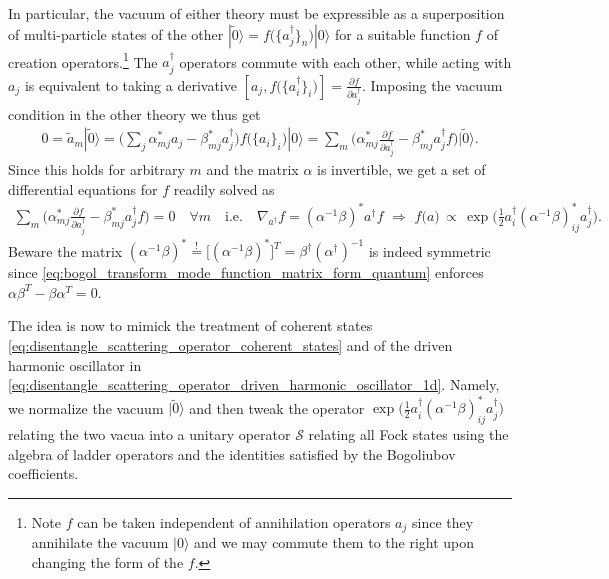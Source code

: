 \documentclass[../QFT_main.tex]{subfiles}
\begin{document}
\begin{mytheorem}
In particular, the vacuum of either theory must be expressible as a superposition of multi-particle states of the other $|\tilde{0}\rangle =f\big(\{{a}^\dagger_j\}_n\big)|0\rangle$ for a suitable function $f$ of creation operators.\footnote{Note $f$ can be taken independent of annihilation operators ${a}_j$ since they annihilate the vacuum $|0\rangle$ and we may commute them to the right upon changing the form of the $f$.}
The ${a}_j^\dagger$ operators commute with each other, while acting with $a_j$ is equivalent to taking a derivative $[a_j,f\big(\{a^\dagger_i\}_i\big)] = \tfrac{\partial f}{\partial a_j^\dagger}$.
Imposing the vacuum condition in the other theory we thus get
{\small
\begin{align}
     0=\tilde{a}_m|\tilde{0}\rangle
     = \Big(\sum_j \alpha_{mj}^* a_j - \beta_{mj}^* a_j^\dagger\Big) f\big(\{a_i\}_i\big)|0\rangle = \sum_m \Big(\alpha_{mj}^* \frac{\partial f}{\partial a_j^\dagger} - \beta_{mj}^* a_j^\dagger f\Big)|\tilde{0}\rangle.
\end{align}}
Since this holds for arbitrary $m$ and the matrix $\alpha$ is invertible, we get a set of differential equations for $f$ readily solved as
{\small\begin{align}
    \sum_m \Big(\alpha_{mj}^* \frac{\partial f}{\partial a_j^\dagger} - \beta_{mj}^* a_j^\dagger f\Big) = 0 \quad \forall m \quad \text{i.e.}\quad \nabla_{a^\dagger}f = (\alpha^{-1}\beta)^* a^\dagger f
    \,\,\Rightarrow\,\, f\big(a)\, \propto\,  \exp\Big(\tfrac{1}{2} a^\dagger_i (\alpha^{-1}\beta)^*_{ij} a^\dagger_j\Big).
\end{align}}
Beware the matrix {\small$(\alpha^{-1}\beta)^*\overset{!}{=}\big[(\alpha^{-1}\beta)^*\big]^T =\beta^\dagger (\alpha^\dagger)^{-1}$} is indeed symmetric since \eqref{eq:bogol_transform_mode_function_matrix_form_quantum} enforces {\small$\alpha\beta^T-\beta\alpha^T=0$}.

The idea is now to mimick the treatment of coherent states \eqref{eq:disentangle_scattering_operator_coherent_states} and of the driven harmonic oscillator in \eqref{eq:disentangle_scattering_operator_driven_harmonic_oscillator_1d}.
Namely, we normalize the vacuum $|\tilde{0}\rangle$ and then tweak the operator $\exp\big(\tfrac{1}{2} a^\dagger_i (\alpha^{-1}\beta)^*_{ij} a^\dagger_j\big)$ relating the two vacua into a unitary operator $\mathcal{S}$ relating all Fock states using the algebra of ladder operators and the identities satisfied by the Bogoliubov coefficients.


\end{mytheorem}
\end{document}
